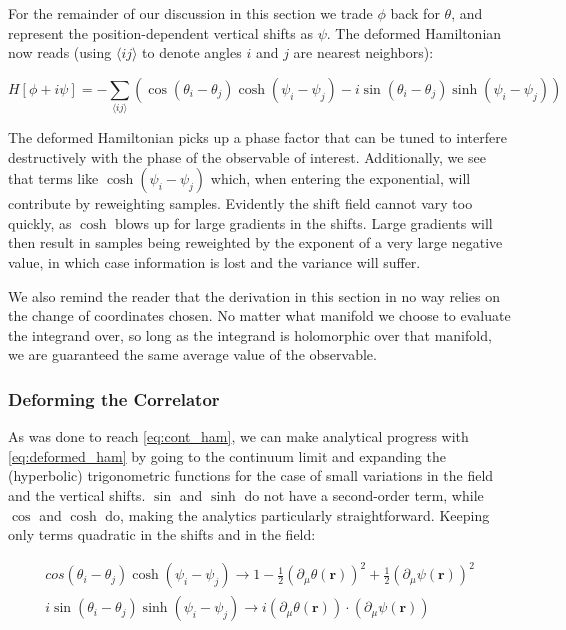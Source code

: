 \documentclass[12pt]{article}
\begin{document}
For the remainder of our discussion in this section
we trade $\phi$ back for $\theta$, and represent the position-dependent vertical shifts as $\psi$. The deformed Hamiltonian now reads 
(using $\langle ij \rangle$ to denote angles $i$ and $j$ are nearest neighbors):

\begin{equation} \label{eq:deformed_ham}
	H[\phi + i \psi] = -\sum_{\langle ij \rangle} \left(\cos(\theta_i-\theta_j)\cosh(\psi_i-\psi_j) -
	i \sin(\theta_i-\theta_j)\sinh(\psi_i-\psi_j) \right)
\end{equation}

The deformed Hamiltonian picks up a phase factor that can be tuned to interfere destructively with the phase of the observable of interest. 
Additionally, we see that terms like $\cosh(\psi_i - \psi_j)$ which, when entering the exponential, will contribute by reweighting samples. 
Evidently the shift field cannot vary too quickly, as $\cosh$ blows up for large gradients in the shifts. Large gradients will then result in samples being
reweighted by the exponent of a very large negative value, in which case information is lost and the variance will suffer.

We also remind the reader that the derivation in this section in no way relies on the change of coordinates chosen. No matter what manifold
we choose to evaluate the integrand over, so long as the integrand is holomorphic over that manifold, we are guaranteed the same average value
of the observable.

\subsubsection{Deforming the Correlator}

As was done to reach \ref{eq:cont_ham}, we can make analytical progress with \ref{eq:deformed_ham} by going to the continuum limit and
expanding the (hyperbolic) trigonometric functions for the case of small variations in the field and the vertical shifts. $\sin$ and $\sinh$ do not
have a second-order term, while $\cos$ and $\cosh$ do, making the analytics particularly straightforward. Keeping only terms quadratic
in the shifts and in the field:

\begin{equation*}
	\begin{split}
		cos(\theta_i-\theta_j)\cosh(\psi_i-\psi_j) \rightarrow 1 - \frac{1}{2}(\partial_\mu \theta(\mathbf{r}))^2 + \frac{1}{2}(\partial_\mu \psi(\mathbf{r}))^2 \\
		i \sin(\theta_i-\theta_j)\sinh(\psi_i-\psi_j) \rightarrow i(\partial_\mu \theta(\mathbf{r})) \cdot (\partial_\mu \psi(\mathbf{r}))
	\end{split}
\end{equation*}
\end{document}

